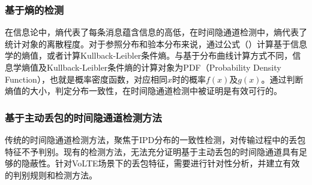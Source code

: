 \subsubsection{基于熵的检测}
在信息论中，熵代表了每条消息蕴含信息的高低，在时间隐通道检测中，熵代表了统计对象的离散程度。对于参照分布和验本分布来说，通过公式（）计算基于信息学的熵值，或者计算Kullback-Leibler条件熵。与基于分布曲线计算方式不同，信息学熵值及Kullback-Leibler条件熵的计算对象为PDF（Probability Density Function），也就是概率密度函数，对应相同$x$时的概率$f(x)$及$g(x)$。通过判断熵值的大小，判定分布一致性，在时间隐通道检测中被证明是有效可行的。

\subsubsection{基于主动丢包的时间隐通道检测方法}
传统的时间隐通道检测方法，聚焦于IPD分布的一致性检测，对传输过程中的丢包特征不予判别。现有的检测方法，无法充分证明基于主动丢包的时间隐通道具有足够的隐蔽性。针对VoLTE场景下的丢包特征，需要进行针对性分析，并建立有效的判别规则和检测方法。
